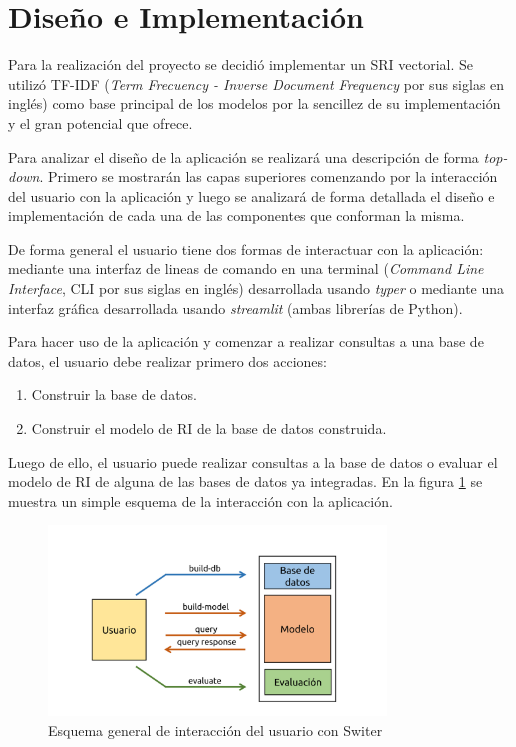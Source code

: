 \section{Diseño e Implementación}\label{sec:design}

Para la realización del proyecto se decidió implementar un SRI vectorial. Se
utilizó TF-IDF (\emph{Term Frecuency - Inverse Document Frequency} por sus
siglas en inglés) como base principal de los modelos por la sencillez de su
implementación y el gran potencial que ofrece.\cite{baeza}

Para analizar el diseño de la aplicación se realizará una descripción de forma
\emph{top-down}. Primero se mostrarán las capas superiores comenzando por la
interacción del usuario con la aplicación y luego se analizará de forma
detallada el diseño e implementación de cada una de las componentes que
conforman la misma.

De forma general el usuario tiene dos formas de interactuar con la aplicación:
mediante una interfaz de lineas de comando en una terminal (\emph{Command Line
Interface}, CLI por sus siglas en inglés) desarrollada usando \emph{typer} o
mediante una interfaz gráfica desarrollada usando \emph{streamlit} (ambas
librerías de Python).

Para hacer uso de la aplicación y comenzar a realizar consultas a una base de
datos, el usuario debe realizar primero dos acciones:

\begin{enumerate}
	\item Construir la base de datos.
	\item Construir el modelo de RI de la base de datos construida.
\end{enumerate}

Luego de ello, el usuario puede realizar consultas a la base de datos o
evaluar el modelo de RI de alguna de las bases de datos ya integradas. En
la figura \ref{fig:interaction} se muestra un simple esquema de la
interacción con la aplicación.

\begin{figure}[htb]%
	\begin{center}
		\includegraphics[width=0.8\textwidth]{./sri_01.png}
	\end{center}
	\caption{Esquema general de interacción del usuario con Switer}
	\label{fig:interaction}
\end{figure}

